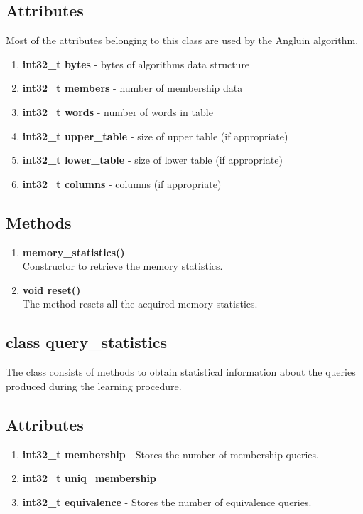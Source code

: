 \subsection*{Attributes}
Most of the attributes belonging to this class are used by the Angluin algorithm.
\begin{enumerate}
 \item \textbf{int32\_t bytes} - bytes of algorithms data structure
 \item \textbf{int32\_t members} - number of membership data
 \item \textbf{int32\_t words} - number of words in table
 \item \textbf{int32\_t upper\_table} - size of upper table (if appropriate)
 \item \textbf{int32\_t lower\_table} - size of lower table (if appropriate)
 \item \textbf{int32\_t columns} - columns (if appropriate)
\end{enumerate}
\subsection*{Methods}
\begin{enumerate}
 \item \textbf{memory\_statistics()} \\
	Constructor to retrieve the memory statistics.
 \item \textbf{void reset()} \\
        The method resets all the acquired memory statistics.
\end{enumerate}

\subsection{class query\_statistics}
The class consists of methods to obtain statistical information about the queries produced during the learning procedure.
\subsection*{Attributes}
\begin{enumerate}
 \item \textbf{int32\_t membership} - Stores the number of membership queries.
 \item \textbf{int32\_t uniq\_membership}
 \item \textbf{int32\_t equivalence} - Stores the number of equivalence queries.
\end{enumerate}
